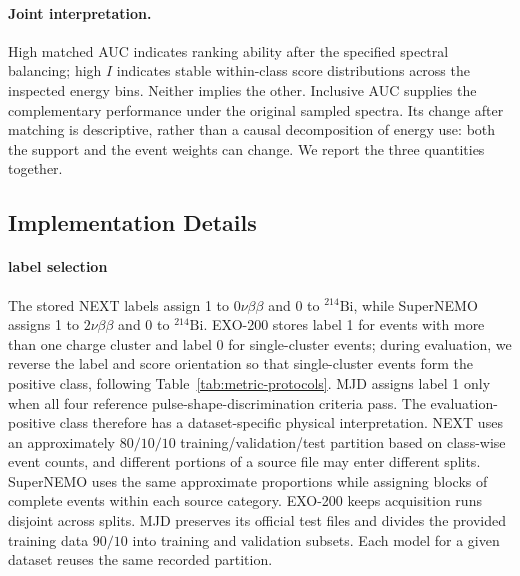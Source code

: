 \paragraph{Joint interpretation.}
High matched AUC indicates ranking ability after the specified spectral
balancing; high $I$ indicates stable within-class score distributions across
the inspected energy bins. Neither implies the other. Inclusive AUC supplies
the complementary performance under the original sampled spectra. Its change
after matching is descriptive, rather than a causal decomposition of energy
use: both the support and the event weights can change. We report the three
quantities together.

\subsection{Implementation Details}\label{app:detail}


\paragraph{label selection} The stored NEXT labels assign 1 to $0\nu\beta\beta$ and 0 to
$^{214}\mathrm{Bi}$, while SuperNEMO assigns 1 to $2\nu\beta\beta$ and 0 to
$^{214}\mathrm{Bi}$. EXO-200 stores label 1 for events with more than one
charge cluster and label 0 for single-cluster events; during evaluation, we
reverse the label and score orientation so that single-cluster events form
the positive class, following Table~\ref{tab:metric-protocols}. MJD assigns
label 1 only when all four reference pulse-shape-discrimination criteria
pass. The evaluation-positive class therefore has a dataset-specific
physical interpretation. NEXT uses an approximately $80/10/10$
training/validation/test partition based on class-wise event counts, and
different portions of a source file may enter different splits. SuperNEMO
uses the same approximate proportions while assigning blocks of complete
events within each source category. EXO-200 keeps acquisition runs disjoint
across splits. MJD preserves its official test files and divides the provided
training data $90/10$ into training and validation subsets. Each model for a
given dataset reuses the same recorded partition.

